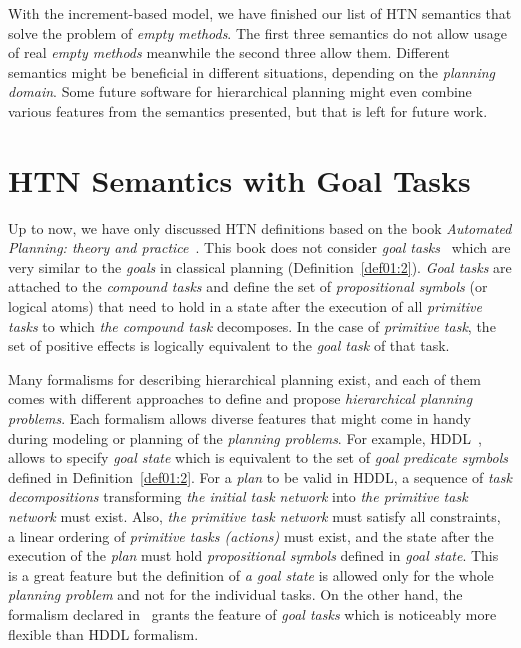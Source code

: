 \medskip\noindent
With the increment-based model, we have finished our list of HTN semantics that solve the problem of \emph{empty methods}. The first three semantics do not allow usage of real \emph{empty methods} meanwhile the second three allow them. Different semantics might be beneficial in different situations, depending on the \emph{planning domain}. Some future software for hierarchical planning might even combine various features from the semantics presented, but that is left for future work.
 
\section{{HTN} Semantics with Goal Tasks}

\medskip\noindent
Up to now, we have only discussed HTN definitions based on the book \emph{Automated Planning: theory and practice}~\cite{nau}. This book does not consider \emph{goal tasks}~\cite{complexity} which are very similar to the \emph{goals} in classical planning (Definition~\ref{def01:2}). \emph{Goal tasks} are attached to the \emph{compound tasks} and define the set of \emph{propositional symbols} (or logical atoms) that need to hold in a state after the execution of all \emph{primitive tasks} to which \emph{the compound task} decomposes. In the case of \emph{primitive task}, the set of positive effects is logically equivalent to the \emph{goal task} of that task. 

\medskip\noindent
Many formalisms for describing hierarchical planning exist, and each of them comes with different approaches to define and propose \emph{hierarchical planning problems}. Each formalism allows diverse features that might come in handy during modeling or planning of the \emph{planning problems}. For example, HDDL~\cite{hddl}, allows to specify \emph{goal state} which is equivalent to the set of \emph{goal predicate symbols} defined in Definition~\ref{def01:2}. For a \emph{plan} to be valid in HDDL, a sequence of \emph{task decompositions} transforming \emph{the initial task network} into \emph{the primitive task network} must exist. Also, \emph{the primitive task network} must satisfy all constraints, a linear ordering of \emph{primitive tasks (actions)} must exist, and the state after the execution of the \emph{plan} must hold \emph{propositional symbols} defined in \emph{goal state}. This is a great feature but the definition of \emph{a goal state} is allowed only for the whole \emph{planning problem} and not for the individual tasks. On the other hand, the formalism declared in~\cite{complexity} grants the feature of \emph{goal tasks} which is noticeably more flexible than HDDL formalism.

